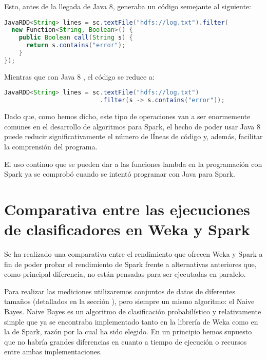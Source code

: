 Esto, antes de la llegada de Java 8, generaba un código semejante al siguiente:

\begin{lstlisting}[language=Java,frame=single]
JavaRDD<String> lines = sc.textFile("hdfs://log.txt").filter(
  new Function<String, Boolean>() {
    public Boolean call(String s) {
      return s.contains("error");
    }
});
\end{lstlisting}

Mientras que con Java 8 , el código se reduce a:

\begin{lstlisting}[language=Java,frame=single]
JavaRDD<String> lines = sc.textFile("hdfs://log.txt")
                          .filter(s -> s.contains("error"));
\end{lstlisting}

Dado que, como hemos dicho, este tipo de operaciones van a ser enormemente comunes en el desarrollo de algoritmos para Spark, el hecho de poder usar Java 8 puede reducir significativamente el número de lÍneas de código y, además, facilitar la comprensión del programa.

El uso continuo que se pueden dar a las funciones lambda en la programación con Spark ya se comprobó cuando se intentó programar con Java para Spark.




\section{Comparativa entre las ejecuciones de clasificadores en Weka y Spark}

Se ha realizado una comparativa entre el rendimiento que ofrecen Weka y Spark a fin de poder probar el rendimiento de Spark frente a alternativas anteriores que, como principal diferencia, no están pensadas para ser ejecutadas en paralelo.

Para realizar las mediciones utilizaremos conjuntos de datos de diferentes tamaños (detallados en la sección ), pero siempre un mismo algoritmo: el Naive Bayes. Naive Bayes es un algoritmo de clasificación probabilístico y relativamente simple que ya se encontraba implementado tanto en la librería de Weka como en la de Spark, razón por la cual ha sido elegido. En un principio hemos supuesto que no habría grandes diferencias en cuanto a tiempo de ejecución o recursos entre ambas implementaciones.

